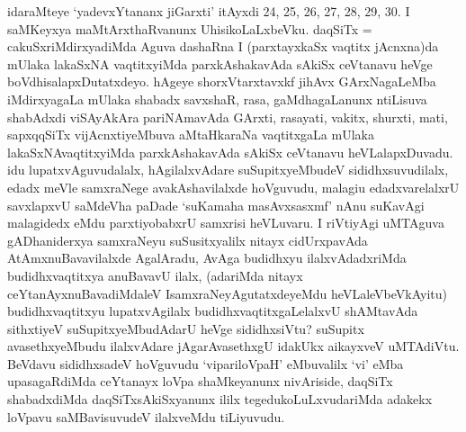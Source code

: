 \begin{artha}
idaraMteye `yadevxYtananx jiGarxti' itAyxdi 24, 25, 26, 27, 28, 29, 30. I saMKeyxya maMtArxthaRvanunx UhisikoLaLxbeVku. daqSiTx = cakuSxriMdirxyadiMda Aguva dashaRna I (parxtayxkaSx vaqtitx jAcnxna)da mUlaka lakaSxNA vaqtitxyiMda parxkAshakavAda sAkiSx ceVtanavu heVge boVdhisalapxDutatxdeyo. hAgeye shorxVtarxtavxkf jihAvx GArxNagaLeMba iMdirxyagaLa mUlaka shabadx savxshaR, rasa, gaMdhagaLanunx ntiLisuva shabAdxdi viSAyAkAra pariNAmavAda GArxti, rasayati, vakitx, shurxti, mati, sapxqqSiTx vijAcnxtiyeMbuva aMtaHkaraNa vaqtitxgaLa mUlaka lakaSxNAvaqtitxyiMda parxkAshakavAda sAkiSx ceVtanavu heVLalapxDuvadu. idu lupatxvAguvudalalx, hAgilalxvAdare suSupitxyeMbudeV sididhxsuvudilalx, edadx meVle samxraNege avakAshavilalxde hoVguvudu, malagiu edadxvarelalxrU savxlapxvU saMdeVha paDade `suKamaha masAvxsasxmf' nAnu suKavAgi malagidedx eMdu parxtiyobabxrU samxrisi heVLuvaru. I riVtiyAgi uMTAguva gADhaniderxya samxraNeyu suSusitxyalilx nitayx cidUrxpavAda AtAmxnuBavavilalxde AgalAradu, AvAga budidhxyu ilalxvAdadxriMda budidhxvaqtitxya anuBavavU ilalx, (adariMda nitayx ceYtanAyxnuBavadiMdaleV IsamxraNeyAgutatxdeyeMdu heVLaleVbeVkAyitu) budidhxvaqtitxyu lupatxvAgilalx budidhxvaqtitxgaLelalxvU shAMtavAda sithxtiyeV suSupitxyeMbudAdarU heVge sididhxsiVtu? suSupitx avasethxyeMbudu ilalxvAdare jAgarAvasethxgU idakUkx aikayxveV uMTAdiVtu. BeVdavu sididhxsadeV hoVguvudu `vipariloVpaH' eMbuvalilx `vi' eMba upasagaRdiMda ceYtanayx loVpa shaMkeyanunx nivAriside, daqSiTx shabadxdiMda daqSiTxsAkiSxyanunx ililx tegedukoLuLxvudariMda adakekx loVpavu saMBavisuvudeV ilalxveMdu tiLiyuvudu.
\end{artha}
